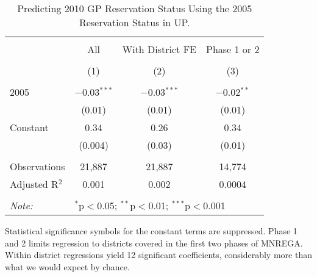 \begin{table}[!htbp]
\centering
\begin{threeparttable}

  \caption{Predicting 2010 GP Reservation Status Using the 2005 Reservation Status in UP.} 
  \label{rand_or_no_up} 
\scriptsize 
\begin{tabular}{@{\extracolsep{0pt}}lccc} 
\\[-1.8ex]\hline 
\hline \\[-1.8ex] 
 & All & With District FE & Phase 1 or 2 \\ 
\\[-1.8ex] & (1) & (2) & (3)\\ 
\hline \\[-1.8ex] 
 2005 & $-$0.03$^{***}$ & $-$0.03$^{***}$ & $-$0.02$^{**}$ \\ 
  & (0.01) & (0.01) & (0.01) \\ 
  Constant & 0.34 & 0.26 & 0.34 \\ 
  & (0.004) & (0.03) & (0.01) \\ 
 \hline \\[-1.8ex] 
Observations & 21,887 & 21,887 & 14,774 \\ 
Adjusted R$^{2}$ & 0.001 & 0.002 & 0.0004 \\ 
\hline 
\hline \\[-1.8ex] 
\textit{Note:}  & \multicolumn{3}{l}{$^{*}$p$<$0.05; $^{**}$p$<$0.01; $^{***}$p$<$0.001} \\ 
\end{tabular} 
\begin{tablenotes}[flushleft]
\scriptsize
\item Statistical significance symbols for the constant terms are suppressed.
                   Phase 1 and 2 limits regression to districts covered in the first two phases of MNREGA.
                   Within district regressions yield 12 significant coefficients, considerably more than what we would expect by chance.
\end{tablenotes}
\end{threeparttable}
\end{table}
